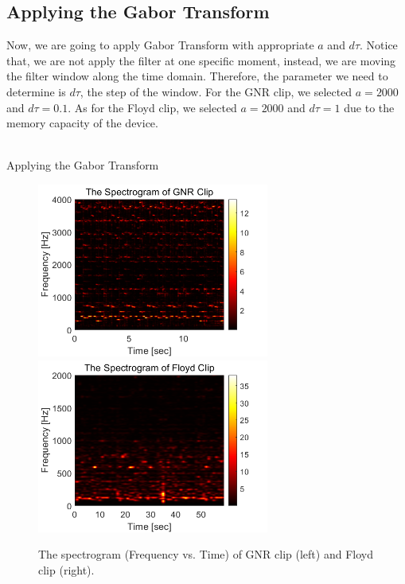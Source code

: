\documentclass{article}
\begin{document}
\subsection{Applying the Gabor Transform}
Now, we are going to apply Gabor Transform with appropriate $a$ and $d\tau$. Notice that, we are not apply the filter at one specific moment, instead, we are moving the filter window along the time domain. Therefore, the parameter we need to determine is $d\tau$, the step of the window. For the GNR clip, we selected $a=2000$ and $d\tau=0.1$. As for the Floyd clip, we selected $a=2000$ and $d\tau=1$ due to the memory capacity of the device. \\
~\\

\begin{algorithm}
\begin{algorithmic}
    \ENDFOR
\end{algorithmic}
\caption{Applying the Gabor Transform}
\end{algorithm}
\begin{figure}[h]
    \centerline{\includegraphics[width=3in]{spect_GNR.png}\includegraphics[width=3in]{spect_Floyd.png}}
    \caption{The spectrogram (Frequency vs. Time) of GNR clip (left) and Floyd clip (right).}
\end{figure}
\end{document}
